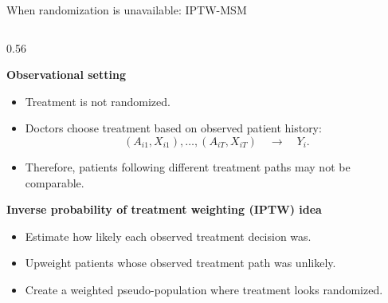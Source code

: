 \documentclass[aspectratio=169,12pt]{beamer}
\begin{document}
\begin{frame}{When randomization is unavailable: IPTW-MSM}
\vspace{-0.38cm}

\begin{columns}[T,onlytextwidth]

\begin{column}{0.56\textwidth}
{\fontsize{7.85}{9.25}\selectfont

\textbf{Observational setting}

\vspace{0.12cm}

\begin{itemize}
  \setlength\itemsep{0.33em}
  \setlength\parskip{0pt}
  \setlength\parsep{0pt}

  \item Treatment is not randomized.

  \item Doctors choose treatment based on observed patient history:
  \[
  (A_{i1},X_{i1}),\ldots,(A_{iT},X_{iT}) \quad \longrightarrow \quad Y_i.
  \]

  \item Therefore, patients following different treatment paths may not be comparable.

\end{itemize}

\vspace{0.16cm}

\textbf{Inverse probability of treatment weighting (IPTW) idea}

\vspace{0.12cm}

\begin{itemize}
  \setlength\itemsep{0.33em}
  \setlength\parskip{0pt}
  \setlength\parsep{0pt}

  \item Estimate how likely each observed treatment decision was.

  \item Upweight patients whose observed treatment path was unlikely.

  \item Create a weighted pseudo-population where treatment looks randomized.

\end{itemize}

}
\end{column}
\end{columns}
\end{frame}
\end{document}
